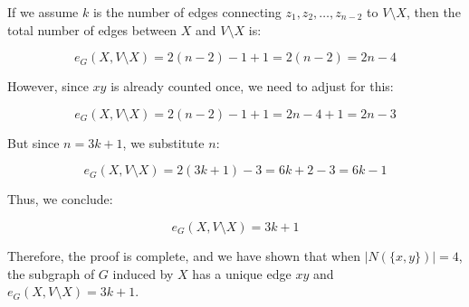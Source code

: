 If we assume \( k \) is the number of edges connecting \( z_1, z_2, \ldots, z_{n-2} \) to \( V \setminus X \), then the total number of edges between \( X \) and \( V \setminus X \) is:

\[
e_G(X, V \setminus X) = 2(n-2) - 1 + 1 = 2(n-2) = 2n - 4
\]

However, since \( xy \) is already counted once, we need to adjust for this:

\[
e_G(X, V \setminus X) = 2(n-2) - 1 + 1 = 2n - 4 + 1 = 2n - 3
\]

But since \( n = 3k + 1 \), we substitute \( n \):

\[
e_G(X, V \setminus X) = 2(3k + 1) - 3 = 6k + 2 - 3 = 6k - 1
\]

Thus, we conclude:

\[
e_G(X, V \setminus X) = 3k + 1
\]

Therefore, the proof is complete, and we have shown that when \( |N(\{x, y\})| = 4 \), the subgraph of \( G \) induced by \( X \) has a unique edge \( xy \) and \( e_G(X, V \setminus X) = 3k + 1 \).